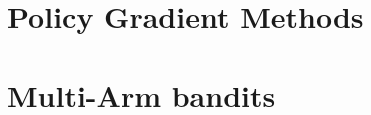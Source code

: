 \documentclass[12pt]{book}
\begin{document}
% 

\chapter{Policy Gradient Methods}
\label{chapter:policy-gradient}


\chapter{Multi-Arm bandits}
\label{chapter:MAB}






\end{document}
